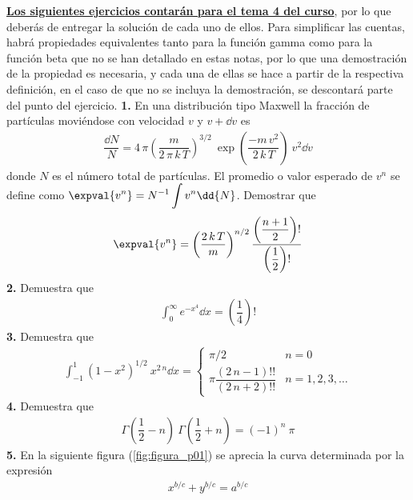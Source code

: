 \underline{\textbf{Los siguientes ejercicios contarán para el tema 4 del curso}}, por lo que deberás de entregar la solución de cada uno de ellos. Para simplificar las cuentas, habrá propiedades equivalentes tanto para la función gamma como para la función beta que no se han detallado en estas notas, por lo que una demostración de la propiedad es necesaria, y cada una de ellas se hace a partir de la respectiva definición, en el caso de que no se incluya la demostración, se descontará parte del punto del ejercicio.
\textbf{1.} En una distribución tipo Maxwell la fracción de partículas moviéndose con velocidad $v$ y $v +\dd{v}$ es
\begin{align*}
\dfrac{\dd{N}}{N} = 4 \, \pi \left( \dfrac{m}{2 \, \pi \, k \, T} \right)^{3/2} \: \exp \left( \dfrac{-m \, v^{2}}{2 \, k \, T} \right) \: v^{2} \dd{v}
\end{align*}
donde $N$ es el número total de partículas. El promedio o valor esperado de $v^{n}$ se define como $\displaystyle \expval{v^{n}} = N^{-1} \int v^{n} \dd{N}$. Demostrar que
\begin{align*}
\expval{v^{n}} = \left( \dfrac{2 \, k \, T}{m} \right)^{n/2} \dfrac{\left( \dfrac{n + 1}{2} \right) !} { \left( \dfrac{1}{2} \right) !}
\end{align*}
\textbf{2.}  Demuestra que
\begin{align*}
\int_{0}^{\infty} e^{-x^{4}} \dd{x} = \left( \dfrac{1}{4} \right) !
\end{align*}
\textbf{3.} Demuestra que
\begin{align*}
\int_{-1}^{1} (1-x^{2})^{1/2} \: x^{2 \, n} \dd{x} =  
\begin{cases}
\pi/2 & n = 0 \\[1em]
\pi \dfrac{(2 \, n - 1)!!}{(2 \, n + 2)!!} & n = 1,2,3,\ldots  \end{cases}
\end{align*} 
\textbf{4.} Demuestra que 
\begin{align*}
\Gamma \left( \dfrac{1}{2} - n \right) \: \Gamma \left( \dfrac{1}{2} + n \right) = (-1)^{n} \: \pi
\end{align*}
\textbf{5.} En la siguiente figura (\ref{fig:figura_p01}) se aprecia la curva determinada por la expresión
\begin{align*}
x^{b/c} + y^{b/c} = a^{b/c}
\end{align*}

